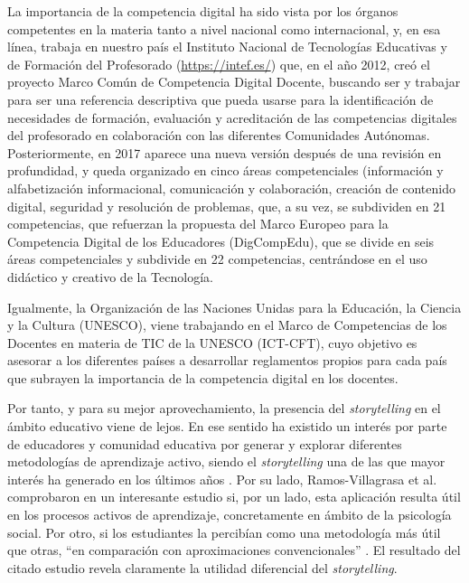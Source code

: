 \documentclass[spanish]{textolivre}
\begin{document}
La importancia de la competencia digital ha sido vista por los órganos competentes en la materia tanto a nivel nacional como internacional, y, en esa línea, trabaja en nuestro país el Instituto Nacional de Tecnologías Educativas y de Formación del Profesorado \cite{intef_marco_2017} (\url{https://intef.es/}) que, en el año 2012, creó el proyecto Marco Común de Competencia Digital Docente, buscando ser y trabajar para ser una referencia descriptiva que pueda usarse para la identificación de necesidades de formación, evaluación y acreditación de las competencias digitales del profesorado en colaboración con las diferentes Comunidades Autónomas. Posteriormente, en 2017 aparece una nueva versión después de una revisión en profundidad, y queda organizado en cinco áreas competenciales (información y alfabetización informacional, comunicación y colaboración, creación de contenido digital, seguridad y resolución de problemas, que, a su vez, se subdividen en 21 competencias, que refuerzan la propuesta del Marco Europeo para la Competencia Digital de los Educadores (DigCompEdu), que se divide en seis áreas competenciales y subdivide en 22 competencias, centrándose en el uso didáctico y creativo de la Tecnología. 

Igualmente, la Organización de las Naciones Unidas para la Educación, la Ciencia y la Cultura (UNESCO), viene trabajando en el Marco de Competencias de los Docentes en materia de TIC de la UNESCO (ICT-CFT), cuyo objetivo es asesorar a los diferentes países a desarrollar reglamentos propios para cada país que subrayen la importancia de la competencia digital en los docentes.

Por tanto, y para su mejor aprovechamiento, la presencia del \textit{storytelling} en el ámbito educativo viene de lejos. En ese sentido ha existido un interés por parte de educadores y comunidad educativa por generar y explorar diferentes metodologías de aprendizaje activo, siendo el \textit{storytelling} una de las que mayor interés ha generado en los últimos años \cite{flanagan_how_2015}. Por su lado, Ramos-Villagrasa et al. comprobaron en un interesante estudio si, por un lado, esta aplicación resulta útil en los procesos activos de aprendizaje, concretamente en ámbito de la psicología social. Por otro, si los estudiantes la percibían como una metodología más útil que otras, “en comparación con aproximaciones convencionales” \cite[p. 12]{ramos_villagrasa_storytelling:_2019}. El resultado del citado estudio revela claramente la utilidad diferencial del \textit{storytelling}.
\end{document}
